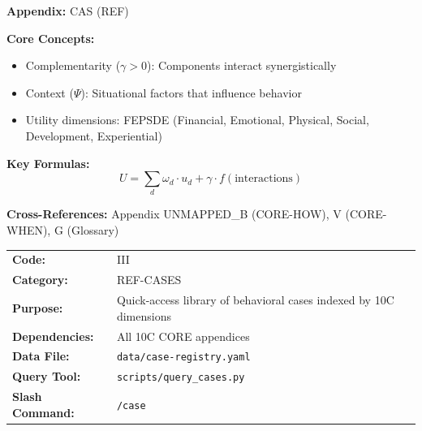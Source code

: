 \begin{tcolorbox}[colback=blue!5!white, colframe=blue!75!black,
    title=Quick Reference: Case Registry: 10C-Indexed Example Library]

\textbf{Appendix:} CAS (REF)

\textbf{Core Concepts:}
\begin{itemize}[nosep]
\item Complementarity ($\gamma > 0$): Components interact synergistically
\item Context ($\Psi$): Situational factors that influence behavior
\item Utility dimensions: FEPSDE (Financial, Emotional, Physical, Social, Development, Experiential)
\end{itemize}

\textbf{Key Formulas:}
\begin{equation}
U = \sum_d \omega_d \cdot u_d + \gamma \cdot f(\text{interactions})
\end{equation}

\textbf{Cross-References:} Appendix UNMAPPED_B (CORE-HOW), V (CORE-WHEN), G (Glossary)
\end{tcolorbox}





\begin{tcolorbox}[colback=gray!5, colframe=gray!50, title=Appendix Metadata]
\begin{tabular}{ll}
\textbf{Code:} & III \\
\textbf{Category:} & REF-CASES \\
\textbf{Purpose:} & Quick-access library of behavioral cases indexed by 10C dimensions \\
\textbf{Dependencies:} & All 10C CORE appendices \\
\textbf{Data File:} & \texttt{data/case-registry.yaml} \\
\textbf{Query Tool:} & \texttt{scripts/query\_cases.py} \\
\textbf{Slash Command:} & \texttt{/case} \\
\end{tabular}
\end{tcolorbox}

